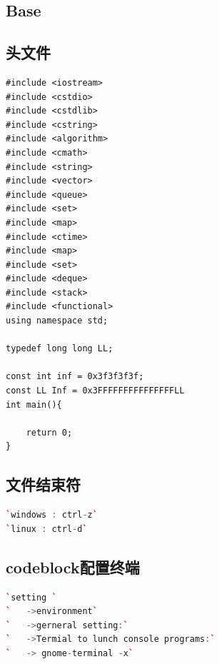 \documentclass[a4paper]{article}
\begin{document}
\begin{CJK*}{UTF8}{gbsn}
\begin{multicols}{3}
\renewcommand{\contentsname}{目录}

\tableofcontents

\clearpage 



\begin{flushleft} 

% 
%
% 
%


\section{Base}
\subsection{头文件}

\begin{lstlisting}
#include <iostream>
#include <cstdio>
#include <cstdlib>
#include <cstring>
#include <algorithm>
#include <cmath>
#include <string>
#include <vector>
#include <queue>
#include <set>
#include <map>
#include <ctime>
#include <map>
#include <set>
#include <deque>
#include <stack>
#include <functional>
using namespace std;

typedef long long LL;

const int inf = 0x3f3f3f3f;
const LL Inf = 0x3FFFFFFFFFFFFFFFLL
int main(){

    return 0;
}
\end{lstlisting}

\subsection{文件结束符}
\begin{lstlisting}[language={c++}]
`windows : ctrl-z`
`linux : ctrl-d`
\end{lstlisting}

\subsection{codeblock配置终端}
\begin{lstlisting}[language={c++}]
`setting `
`	->environment`
`	->gerneral setting:`
`	->Termial to lunch console programs:`
`	-> gnome-terminal -x`
\end{lstlisting}


\end{flushleft}
\end{multicols}
\end{CJK*}
\end{document}
